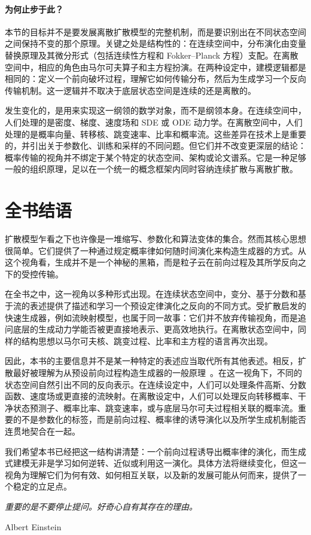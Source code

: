 \paragraph{为何止步于此？}
本节的目标并不是要发展离散扩散模型的完整机制，而是要识别出在不同状态空间之间保持不变的那个原理。关键之处是结构性的：在连续空间中，分布演化由变量替换原理及其微分形式（包括连续性方程和 Fokker--Planck 方程）支配。在离散空间中，相应的角色由马尔可夫算子和主方程扮演。在两种设定中，建模逻辑都是相同的：定义一个前向破坏过程，理解它如何传输分布，然后为生成学习一个反向传输机制。这一逻辑并不取决于底层状态空间是连续的还是离散的。

发生变化的，是用来实现这一纲领的数学对象，而不是纲领本身。在连续空间中，人们处理的是密度、梯度、速度场和 SDE 或 ODE 动力学。在离散空间中，人们处理的是概率向量、转移核、跳变速率、比率和概率流。这些差异在技术上是重要的，并引出关于参数化、训练和采样的不同问题。但它们并不改变更深层的结论：概率传输的视角并不绑定于某个特定的状态空间、架构或论文谱系。它是一种足够一般的组织原理，足以在一个统一的概念框架内同时容纳连续扩散与离散扩散。

\clearpage
\newpage

\section{全书结语}\label{sec:epilogue-closing}
扩散模型乍看之下也许像是一堆缩写、参数化和算法变体的集合。然而其核心思想很简单。它们提供了一种通过规定概率律如何随时间演化来构造生成器的方式。从这个视角看，生成并不是一个神秘的黑箱，而是粒子云在前向过程及其所学反向之下的受控传输。

在全书之中，这一视角以多种形式出现。在连续状态空间中，变分、基于分数和基于流的表述提供了描述和学习一个预设定律演化之反向的不同方式。受扩散启发的快速生成器，例如流映射模型，也属于同一故事：它们并不放弃传输视角，而是追问底层的生成动力学能否被更直接地表示、更高效地执行。在离散状态空间中，同样的结构思想以马尔可夫核、跳变过程、比率和主方程的语言再次出现。

因此，本书的主要信息并不是某一种特定的表述应当取代所有其他表述。相反，扩散最好被理解为从预设前向过程构造生成器的一般原理~\citep{lai2026unified}。在这一视角下，不同的状态空间自然引出不同的反向表示。在连续设定中，人们可以处理条件高斯、分数函数、速度场或更直接的流映射。在离散设定中，人们可以处理反向转移概率、干净状态预测子、概率比率、跳变速率，或与底层马尔可夫过程相关联的概率流。重要的不是参数化的标签，而是前向过程、概率律的诱导演化以及所学生成机制能否连贯地契合在一起。

我们希望本书已经把这一结构讲清楚：一个前向过程诱导出概率律的演化，而生成式建模无非是学习如何逆转、近似或利用这一演化。具体方法将继续变化，但这一视角为理解它们为何有效、如何相互关联，以及新的发展可能从何而来，提供了一个稳定的立足点。

\epigraph{\textit{重要的是不要停止提问。好奇心自有其存在的理由。}}{Albert Einstein}
